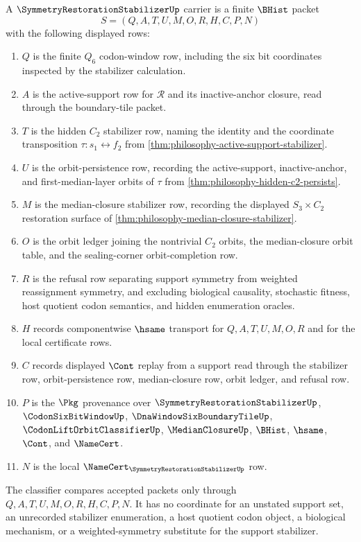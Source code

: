 \begin{definition}
\label{def:symmetry-restoration-stabilizer-carrier}
A $\SymmetryRestorationStabilizerUp$ carrier is a finite $\BHist$ packet
$$
S=(Q,A,T,U,M,O,R,H,C,P,N)
$$
with the following displayed rows:
\begin{enumerate}
\item $Q$ is the finite $Q_{6}$ codon-window row, including the six bit
coordinates inspected by the stabilizer calculation.
\item $A$ is the active-support row for $\mathcal{R}$ and its inactive-anchor
closure, read through the boundary-tile packet.
\item $T$ is the hidden $C_{2}$ stabilizer row, naming the identity and the
coordinate transposition $\tau:s_{1}\leftrightarrow f_{2}$ from
\autoref{thm:philosophy-active-support-stabilizer}.
\item $U$ is the orbit-persistence row, recording the active-support,
inactive-anchor, and first-median-layer orbits of $\tau$ from
\autoref{thm:philosophy-hidden-c2-persists}.
\item $M$ is the median-closure stabilizer row, recording the displayed
$S_{3}\times C_{2}$ restoration surface of
\autoref{thm:philosophy-median-closure-stabilizer}.
\item $O$ is the orbit ledger joining the nontrivial $C_{2}$ orbits, the
median-closure orbit table, and the sealing-corner orbit-completion row.
\item $R$ is the refusal row separating support symmetry from weighted
reassignment symmetry, and excluding biological causality, stochastic
fitness, host quotient codon semantics, and hidden enumeration oracles.
\item $H$ records componentwise $\hsame$ transport for $Q,A,T,U,M,O,R$ and
for the local certificate rows.
\item $C$ records displayed $\Cont$ replay from a support read through the
stabilizer row, orbit-persistence row, median-closure row, orbit ledger, and
refusal row.
\item $P$ is the $\Pkg$ provenance over $\SymmetryRestorationStabilizerUp$,
$\CodonSixBitWindowUp$, $\DnaWindowSixBoundaryTileUp$,
$\CodonLiftOrbitClassifierUp$, $\MedianClosureUp$, $\BHist$, $\hsame$,
$\Cont$, and $\NameCert$.
\item $N$ is the local $\NameCert_{\SymmetryRestorationStabilizerUp}$ row.
\end{enumerate}
The classifier compares accepted packets only through
$Q,A,T,U,M,O,R,H,C,P,N$. It has no coordinate for an unstated support set,
an unrecorded stabilizer enumeration, a host quotient codon object, a
biological mechanism, or a weighted-symmetry substitute for the support
stabilizer.
\end{definition}

